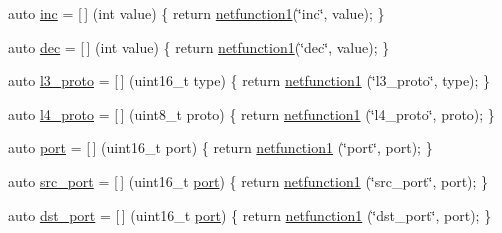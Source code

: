 \begin{DoxyCompactItemize}
\item 
auto \hyperlink{namespacepfq__lang_1_1anonymous__namespace_02default_8hpp_03_a14246183085ec07f08ab9b0d53907ae5}{inc} = \mbox{[}$\,$\mbox{]} (int value) \{ return \hyperlink{namespacepfq__lang_af215f25fa7ebd61fdc90cf0ef78a3164}{netfunction1}(\char`\"{}inc\char`\"{}, value); \}
\item 
auto \hyperlink{namespacepfq__lang_1_1anonymous__namespace_02default_8hpp_03_a6e71e558e459e950a4e9beeaaaf12cf6}{dec} = \mbox{[}$\,$\mbox{]} (int value) \{ return \hyperlink{namespacepfq__lang_af215f25fa7ebd61fdc90cf0ef78a3164}{netfunction1}(\char`\"{}dec\char`\"{}, value); \}
\item 
auto \hyperlink{namespacepfq__lang_1_1anonymous__namespace_02default_8hpp_03_aed01dd5380a873d92397ec0d4c07abac}{l3\+\_\+proto} = \mbox{[}$\,$\mbox{]} (uint16\+\_\+t type) \{ return \hyperlink{namespacepfq__lang_af215f25fa7ebd61fdc90cf0ef78a3164}{netfunction1} (\char`\"{}l3\+\_\+proto\char`\"{}, type); \}
\item 
auto \hyperlink{namespacepfq__lang_1_1anonymous__namespace_02default_8hpp_03_a75da77904f1cff4cc42fc3a081f80670}{l4\+\_\+proto} = \mbox{[}$\,$\mbox{]} (uint8\+\_\+t proto) \{ return \hyperlink{namespacepfq__lang_af215f25fa7ebd61fdc90cf0ef78a3164}{netfunction1} (\char`\"{}l4\+\_\+proto\char`\"{}, proto); \}
\item 
auto \hyperlink{namespacepfq__lang_1_1anonymous__namespace_02default_8hpp_03_a1b370b44e5eedc364f3bb306d5042738}{port} = \mbox{[}$\,$\mbox{]} (uint16\+\_\+t port) \{ return \hyperlink{namespacepfq__lang_af215f25fa7ebd61fdc90cf0ef78a3164}{netfunction1} (\char`\"{}port\char`\"{}, port); \}
\item 
auto \hyperlink{namespacepfq__lang_1_1anonymous__namespace_02default_8hpp_03_ad4d03d1e69ba9608a2d87ac91a2b521f}{src\+\_\+port} = \mbox{[}$\,$\mbox{]} (uint16\+\_\+t \hyperlink{namespacepfq__lang_1_1anonymous__namespace_02default_8hpp_03_a1b370b44e5eedc364f3bb306d5042738}{port}) \{ return \hyperlink{namespacepfq__lang_af215f25fa7ebd61fdc90cf0ef78a3164}{netfunction1} (\char`\"{}src\+\_\+port\char`\"{}, port); \}
\item 
auto \hyperlink{namespacepfq__lang_1_1anonymous__namespace_02default_8hpp_03_aceccbe6ec912638fb8d5d3d9e0372a09}{dst\+\_\+port} = \mbox{[}$\,$\mbox{]} (uint16\+\_\+t \hyperlink{namespacepfq__lang_1_1anonymous__namespace_02default_8hpp_03_a1b370b44e5eedc364f3bb306d5042738}{port}) \{ return \hyperlink{namespacepfq__lang_af215f25fa7ebd61fdc90cf0ef78a3164}{netfunction1} (\char`\"{}dst\+\_\+port\char`\"{}, port); \}

\end{DoxyCompactItemize}
